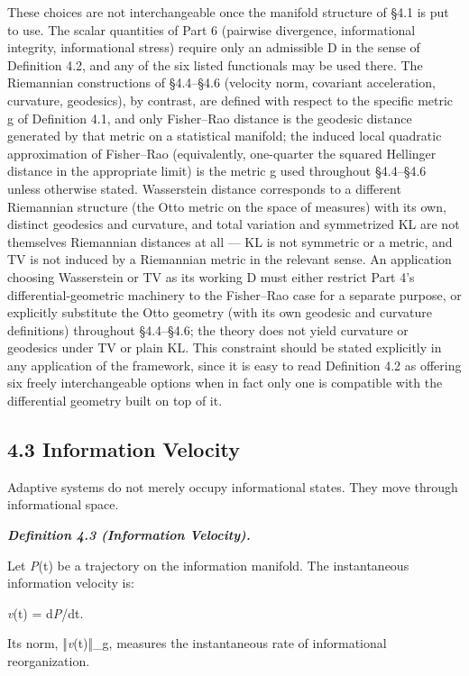 \documentclass[
]{article}
\begin{document}
These choices are not interchangeable once the manifold structure of
§4.1 is put to use. The scalar quantities of Part 6 (pairwise
divergence, informational integrity, informational stress) require only
an admissible D in the sense of Definition 4.2, and any of the six
listed functionals may be used there. The Riemannian constructions of
§4.4--§4.6 (velocity norm, covariant acceleration, curvature,
geodesics), by contrast, are defined with respect to the specific metric
g of Definition 4.1, and only Fisher--Rao distance is the geodesic
distance generated by that metric on a statistical manifold; the induced
local quadratic approximation of Fisher--Rao (equivalently, one-quarter
the squared Hellinger distance in the appropriate limit) is the metric g
used throughout §4.4--§4.6 unless otherwise stated. Wasserstein distance
corresponds to a different Riemannian structure (the Otto metric on the
space of measures) with its own, distinct geodesics and curvature, and
total variation and symmetrized KL are not themselves Riemannian
distances at all --- KL is not symmetric or a metric, and TV is not
induced by a Riemannian metric in the relevant sense. An application
choosing Wasserstein or TV as its working D must either restrict Part
4's differential-geometric machinery to the Fisher--Rao case for a
separate purpose, or explicitly substitute the Otto geometry (with its
own geodesic and curvature definitions) throughout §4.4--§4.6; the
theory does not yield curvature or geodesics under TV or plain KL. This
constraint should be stated explicitly in any application of the
framework, since it is easy to read Definition 4.2 as offering six
freely interchangeable options when in fact only one is compatible with
the differential geometry built on top of it.

\hypertarget{information-velocity}{%
\subsection{4.3 Information Velocity}\label{information-velocity}}

Adaptive systems do not merely occupy informational states. They move
through informational space.

\emph{\textbf{Definition 4.3 (Information Velocity).}}

Let \emph{P}(t) be a trajectory on the information manifold. The
instantaneous information velocity is:

\emph{v}(t) = d\emph{P}/dt.

Its norm, ‖\emph{v}(t)‖\_g, measures the instantaneous rate of
informational reorganization.
\end{document}

